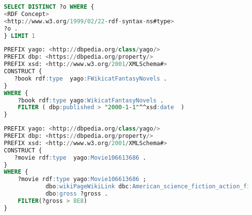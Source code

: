 \documentclass{article}
\begin{document}
\begin{lstlisting}[language=SQL, basicstyle=\footnotesize\ttfamily]
SELECT DISTINCT ?o WHERE {
<RDF Concept> 
<http://www.w3.org/1999/02/22-rdf-syntax-ns#type>
?o .
} LIMIT 1
\end{lstlisting}
\newpage
\begin{lstlisting}[language=SQL, basicstyle=\footnotesize\ttfamily]
PREFIX yago: <http://dbpedia.org/class/yago/>
PREFIX dbp: <https://dbpedia.org/property/>
PREFIX xsd: <http://www.w3.org/2001/XMLSchema#>
CONSTRUCT { 
   ?book rdf:type  yago:FWikicatFantasyNovels .
}
WHERE {
    ?book rdf:type yago:WikicatFantasyNovels .
    FILTER ( dbp:published > "2000-1-1"^^xsd:date  )
}
\end{lstlisting}

\newpage
\begin{lstlisting}[language=SQL, basicstyle=\footnotesize\ttfamily]
PREFIX yago: <http://dbpedia.org/class/yago/>
PREFIX dbp: <https://dbpedia.org/property/>
PREFIX xsd: <http://www.w3.org/2001/XMLSchema#>
CONSTRUCT { 
   ?movie rdf:type  yago:Movie106613686 .
}
WHERE {
    ?movie rdf:type yago:Movie106613686 ;
            dbo:wikiPageWikiLink dbc:American_science_fiction_action_films ;
            dbo:gross ?gross .
    FILTER(?gross > 8E8)
}

\end{lstlisting}
\newpage
\end{document}
